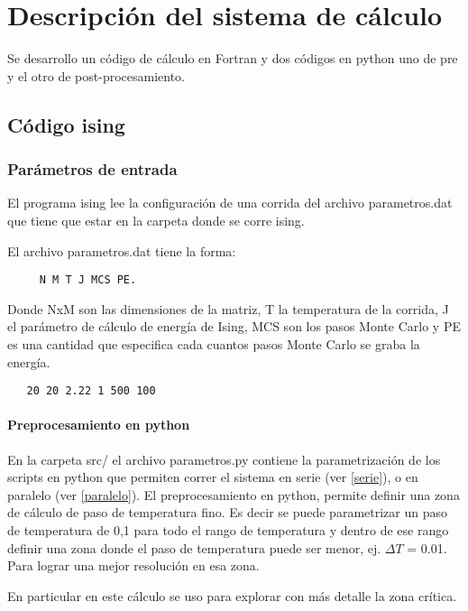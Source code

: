 \section{Descripci\'on del sistema de c\'alculo}


Se desarrollo un c\'odigo de c\'alculo en Fortran y dos c\'odigos
en python uno  de pre y el otro de post-procesamiento.


\subsection{C\'odigo ising}

\subsubsection{Par\'ametros de entrada}

El programa ising lee la configuraci\'on de una corrida del 
archivo parametros.dat que tiene que estar en la carpeta donde se
corre ising.

El archivo parametros.dat tiene la forma: 

\begin{verbatim}
     N M T J MCS PE. 
\end{verbatim}

Donde NxM 
son las dimensiones de la matriz, T la temperatura de la corrida,
J el par\'ametro de c\'alculo de energ\'ia de Ising, MCS son los pasos Monte Carlo y PE
es una cantidad que especifica cada cuantos pasos Monte Carlo se graba la energ\'ia.

\begin{verbatim}
   20 20 2.22 1 500 100
\end{verbatim}


\paragraph{Preprocesamiento en python}
En la carpeta src/ el archivo parametros.py contiene la parametrizaci\'on 
de los scripts
en python que permiten correr el sistema en serie (ver \ref{serie}), 
o en paralelo (ver \ref{paralelo}).
El preprocesamiento en python, permite definir una zona de c\'alculo de paso
de temperatura fino. Es decir se puede parametrizar un paso de temperatura de
0,1 para todo el rango de temperatura y dentro de ese rango definir una zona
donde el paso de temperatura puede ser menor, ej. $\Delta T$ = 0.01. Para lograr una mejor resoluci\'on
en esa zona.

En particular en este c\'alculo se uso para explorar con m\'as detalle la zona
cr\'itica.

